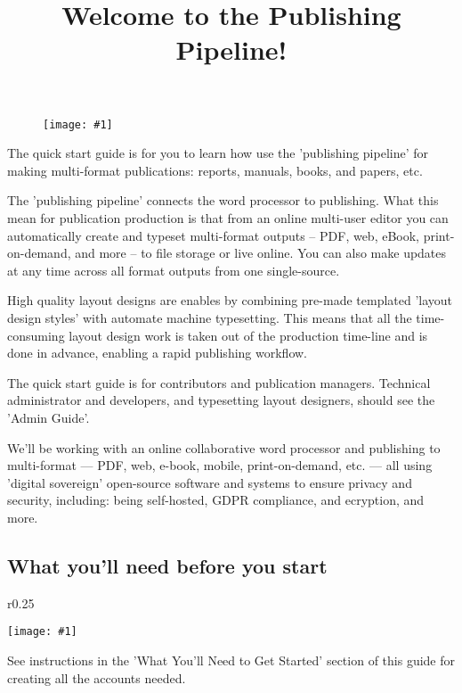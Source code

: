 \documentclass{article}
\newlength{\imgwidth}
\newcommand\scaledgraphics[2]{%
                
\settowidth{\imgwidth}{\texttt{[image: \#1]}}%
                
\setlength{\imgwidth}{\minof{\imgwidth}{#2\textwidth}}%
                
\texttt{[image: \#1]}%
                
}
\begin{document}
\title{Welcome to the Publishing Pipeline!}

\maketitle

\begin{figure}
\scaledgraphics{b3bc6ba5-db38-4ec8-89db-45c029fdb485.png}{0.75}
\label{F98934631}
\end{figure}


The quick start guide is for you to learn how use the 'publishing pipeline' for making multi-format publications: reports, manuals, books, and papers, etc.


The 'publishing pipeline' connects the word processor to publishing. What this mean for publication production is that from an online multi-user editor you can automatically create and typeset multi-format outputs – PDF, web, eBook, print-on-demand, and more – to file storage or live online. You can also make updates at any time across all format outputs from one single-source. 


High quality layout designs are enables by combining pre-made templated 'layout design styles' with automate machine typesetting. This means that all the time-consuming layout design work is taken out of the production time-line and is done in advance, enabling a rapid publishing workflow.


The quick start guide is for contributors and publication managers. Technical administrator and developers, and typesetting layout designers, should see the 'Admin Guide'.


We'll be working with an online collaborative word processor and publishing to multi-format — PDF, web, e-book, mobile, print-on-demand, etc. — all using 'digital sovereign' open-source software and systems to ensure privacy and security, including: being self-hosted, GDPR compliance, and ecryption, and more.


\subsection{What you'll need before you start}\label{H4632171}


\begin{wrapfigure}{r}{0.25\textwidth}
\scaledgraphics{fec439eb-c4d6-4587-a4a2-affde7c45586.png}{0.25}
\label{F18710661}
\end{wrapfigure}


See instructions in the 'What You'll Need to Get Started' section of this guide for creating all the accounts needed.
\end{document}
